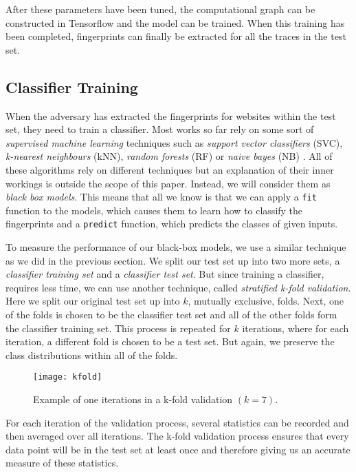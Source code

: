 After these parameters have been tuned, the computational graph can be constructed in Tensorflow and the model can be trained.
When this training has been completed, fingerprints can finally be extracted for all the traces in the test set.

\subsection{Classifier Training} \label{sec:classifier-training}

When the adversary has extracted the fingerprints for websites within the test set, they need to train a classifier.
Most works so far rely on some sort of \textit{supervised machine learning} techniques such as \textit{support vector classifiers} (SVC), \textit{k-nearest neighbours} (kNN), \textit{random forests} (RF) or \textit{naive bayes} (NB) \cite{panchenko1,panchenko2,wang_cai_johnson_nithyanand_goldberg_2014,kfingerprinting,naivebayes}.
All of these algorithms rely on different techniques but an explanation of their inner workings is outside the scope of this paper.
Instead, we will consider them as \textit{black box models}.
This means that all we know is that we can apply a \texttt{fit} function to the models, which causes them to learn how to classify the fingerprints and a \texttt{predict} function, which predicts the classes of given inputs.

To measure the performance of our black-box models, we use a similar technique as we did in the previous section.
We split our test set up into two more sets, a \textit{classifier training set} and a \textit{classifier test set}.
But since training a classifier, requires less time, we can use another technique, called \textit{stratified k-fold validation}.
Here we split our original test set up into $k$, mutually exclusive, folds.
Next, one of the folds is chosen to be the classifier test set and all of the other folds form the classifier training set.
This process is repeated for $k$ iterations, where for each iteration, a different fold is chosen to be a test set.
But again, we preserve the class distributions within all of the folds.

\begin{figure}[ht]
  \centering
  \texttt{[image: kfold]}
  \caption{Example of one iterations in a k-fold validation $(k = 7)$.}
  \label{fig:kfold}
\end{figure}

For each iteration of the validation process, several statistics can be recorded and then averaged over all iterations.
The k-fold validation process ensures that every data point will be in the test set at least once and therefore giving us an accurate measure of these statistics.

